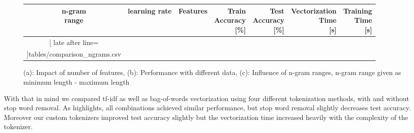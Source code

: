 \documentclass[10pt]{article}
\begin{document}
\begin{figure}[htbp]
\begin{minipage}[t]{0.6\textwidth}
			
			\vspace{10pt} %
			
			\small
			\setlength{\tabcolsep}{4pt}
			\renewcommand{\arraystretch}{1.1}
			\begin{adjustbox}{scale=.8, valign=t}
				\begin{tabular}{|c|c|r|r|r|r|r|}
					\hline
					\rowcolor{gray!30}
					\bfseries \makecell{n-gram\\range} & 
					\bfseries{learning rate} &
					\bfseries Features & 
					\bfseries \makecell{Train\\Accuracy\\{\footnotesize[\%]}} & 
					\bfseries \makecell{Test\\Accuracy\\{\footnotesize[\%]}} & 
					\bfseries \makecell{Vectorization\\Time\\{\footnotesize[s]}} & 
					\bfseries \makecell{Training\\Time\\{\footnotesize[s]}} \\
					\hline
					\csvreader[
					late after line=\\\hline
					]{tables/comparison_ngrams.csv}{}%
					{\csvcoli & \csvcolii & \csvcoliii & \csvcoliv & \csvcolv & \csvcolvi & \csvcolvii}%
				\end{tabular}
			\end{adjustbox}
			\subcaption{}
		\end{minipage}
		
		\caption{(a): Impact of number of features, (b): Performance with different data, (c): Influence of n-gram ranges, n-gram range given as minimum length - maximum length}
		\label{Fig 2}
	\end{figure}
	

	
		
	With that in mind we compared tf-idf as well as bag-of-words vectorization using four different tokenization methods, with and without stop word removal. As  highlights, all combinations achieved similar performance, but stop word removal slightly decreases test accuracy. Moreover our custom tokenizers improved test accuracy slightly but the vectorization time increased heavily with the complexity of the tokenizer. \newline\newline
	
\end{document}
